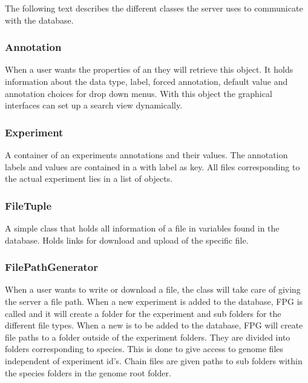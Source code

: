 The following text describes the different classes the server uses to communicate with the database.

\subsubsection{Annotation}
When a user wants the properties of an  they will retrieve this object. It holds information about the data type, label, forced annotation, default value and annotation choices for drop down menus. With this object the graphical interfaces can set up a search view dynamically.

\subsubsection{Experiment}
A container of an experiments annotations and their values. The annotation labels and values are contained in a  with label as key. All files corresponding to the actual experiment lies in a list of  objects.

\subsubsection{FileTuple}
A simple class that holds all information of a file in variables found in the database. Holds links for download and upload of the specific file.

\subsubsection{FilePathGenerator}
When a user wants to write or download a file, the  class will take care of giving the server a file path. When a new experiment is added to the database, FPG is called and it will create a folder for the experiment and sub folders for the different file types. When a new  is to be added to the database, FPG will create file paths to a folder outside of the experiment folders. They are divided into folders corresponding to species.  This is done to give access to genome files independent of experiment id's. Chain files are given paths to sub folders within the species folders in the genome root folder.


